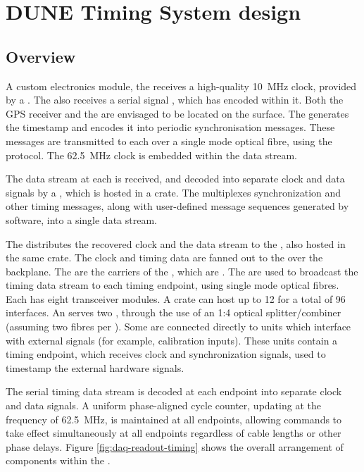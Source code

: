 \documentclass{dune}
\begin{document}
\section{DUNE Timing System design}
\label{sec:system_design}
\subsection{Overview}
A custom electronics module, the  receives a high-quality \SI{10}{\MHz} clock, provided by a . The  also receives a serial  signal \cite{irig}, which has  encoded within it. Both the GPS receiver and the  are envisaged to be located on the surface. The  generates the  timestamp and encodes it into periodic synchronisation messages. These messages are transmitted to each  over a single mode optical fibre, using the  protocol. The \SI{62.5}{\MHz} clock is embedded within the data stream.

The data stream at each  is received, and decoded into separate clock and data signals by a , which is hosted in a  crate. The  multiplexes synchronization and other timing messages, along with user-defined message sequences generated by software, into a single data stream. 

The  distributes the recovered clock and the data stream to the , also hosted in the same  crate. The clock and timing data are fanned out to the  over the  backplane. The  are the carriers of the , which are . The  are used to broadcast the timing data stream to each timing endpoint, using single mode optical fibres. Each  has eight  transceiver modules. A  crate can host up to 12  for a total of 96  interfaces. An  serves two , through the use of an 1:4 optical splitter/combiner (assuming two fibres per ). Some  are connected directly to units which interface with external signals (for example, calibration inputs). These  units contain a timing endpoint, which receives clock and synchronization signals, used to timestamp the external hardware signals.

The serial timing data stream is decoded at each endpoint into separate clock and data signals. A uniform phase-aligned cycle counter, updating at the  frequency of \SI{62.5}{\MHz}, is maintained at all endpoints, allowing commands to take effect simultaneously at all endpoints regardless of cable lengths or other phase delays. Figure \ref{fig:daq-readout-timing} shows the overall arrangement of components within the .
\end{document}
